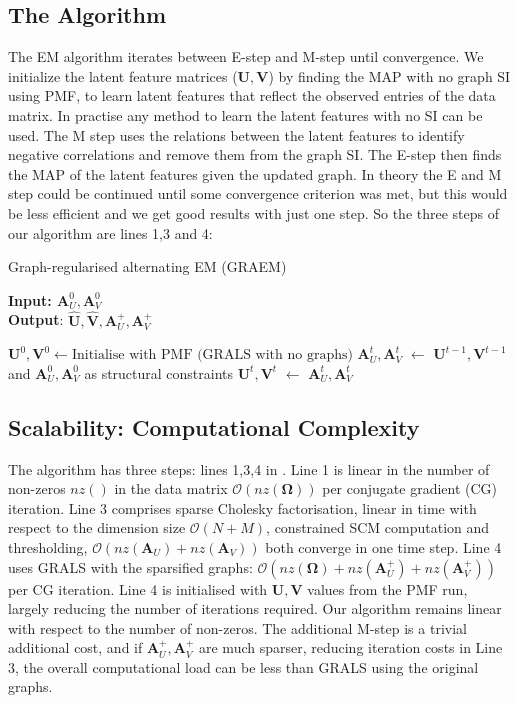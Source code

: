 \documentclass{article}
\theoremstyle{plain}
\theoremstyle{definition}
\theoremstyle{remark}
\def\*#1{\boldsymbol{#1}}
\begin{document}
\subsection{The Algorithm}
The EM algorithm iterates between E-step and M-step until convergence.  We initialize the latent feature matrices ($\*U,\*V$) by finding the MAP with no graph SI using PMF, to learn latent features that reflect the observed entries of the data matrix. In practise any method to learn the latent features with no SI can be used. The M step uses the relations between the latent features to identify negative correlations and remove them from the graph SI. The E-step then finds the MAP of the latent features given the updated graph. In theory the E and M step could be continued until some convergence criterion was met, but this would be less efficient and we get good results with just one step. So the three steps of our algorithm are lines 1,3 and 4:
\begin{algorithm}
\caption{Graph-regularised alternating EM (GRAEM)}
\hspace*{\algorithmicindent} \textbf{Input: $\*A^{0}_U, \*A^{0}_V$} \\
 \hspace*{\algorithmicindent} \textbf{Output}: $\hat{\*U},\hat{\*V},\*A_U^+,\*A_V^+$
 \begin{algorithmic}[1]
\STATE $\*U^0,\*V^0 \gets \text{Initialise with PMF (GRALS with no graphs)}$
\STATE $\*A^{t}_U, \*A^{t}_V$  $\gets$  $\*U^{t-1},\*V^{t-1}$ and $\*A^{0}_U, \*A^{0}_V$ as structural constraints
\STATE $\*U^t, \*V^t$ $\gets$   $\*A^{t}_U, \*A^{t}_V$
\ENDWHILE
\end{algorithmic} \label{algo:GPMF}
\end{algorithm}

\subsection{Scalability: Computational Complexity}

The algorithm has three steps: lines 1,3,4 in . Line 1 is linear in the number of non-zeros $nz()$ in the data matrix $\mathcal{O}(nz(\*\Omega))$ per conjugate gradient (CG) iteration. Line 3 comprises sparse Cholesky factorisation, linear in time with respect to the dimension size $\mathcal{O}(N + M)$, constrained SCM computation and thresholding, $\mathcal{O}(nz(\*A_U) + nz(\*A_V))$ both converge in one time step. Line 4 uses GRALS with the sparsified graphs: $\mathcal{O}(nz(\*\Omega) + nz(\*A^+_U) + nz(\*A^+_V))$ per CG iteration. Line 4 is initialised with $\*U,\*V$ values from the PMF run, largely reducing the number of iterations required. Our algorithm remains linear with respect to the number of non-zeros. The additional M-step is a trivial additional cost, and if $\*A^+_U,\*A_V^+$ are much sparser, reducing iteration costs in Line 3, the overall computational load can be less than GRALS using the original graphs.
\end{document}
